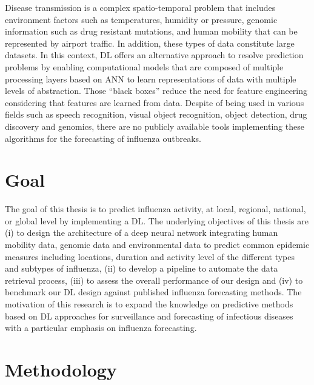 \documentclass[12pt]{article}
\begin{document}
Disease transmission is a complex spatio-temporal problem that includes environment factors\autocite{Pica2012} such as temperatures, humidity or pressure, genomic information such as drug resistant mutations, and human mobility that can be represented by airport traffic. In addition, these types of data constitute large datasets. In this context, DL offers an alternative approach to resolve prediction problems by enabling computational models that are composed of multiple processing layers based on ANN to learn representations of data with multiple levels of abstraction. Those ``black boxes'' reduce the need for feature engineering considering that features are learned from data. Despite of being used in various fields such as speech recognition, visual object recognition, object detection, drug discovery and genomics, there are no publicly available tools implementing these algorithms for the forecasting of influenza outbreaks.

\section{Goal}

The goal of this thesis is to predict influenza activity, at  local, regional, national, or global level by implementing a DL. The underlying objectives of this thesis are (i) to design the architecture of a deep neural network integrating human mobility data, genomic data and environmental data to predict common epidemic measures \autocite{nsoesie2014} including locations,  duration and activity level of the different types and subtypes of influenza,  (ii) to develop a pipeline to automate the data retrieval process, (iii) to assess the overall performance of our design and (iv) to benchmark our DL design against published influenza forecasting methods. The motivation of this research is to expand the knowledge on predictive methods based on DL approaches for surveillance and forecasting of infectious diseases  with  a particular emphasis on  influenza forecasting. 

\section{Methodology}
\end{document}
